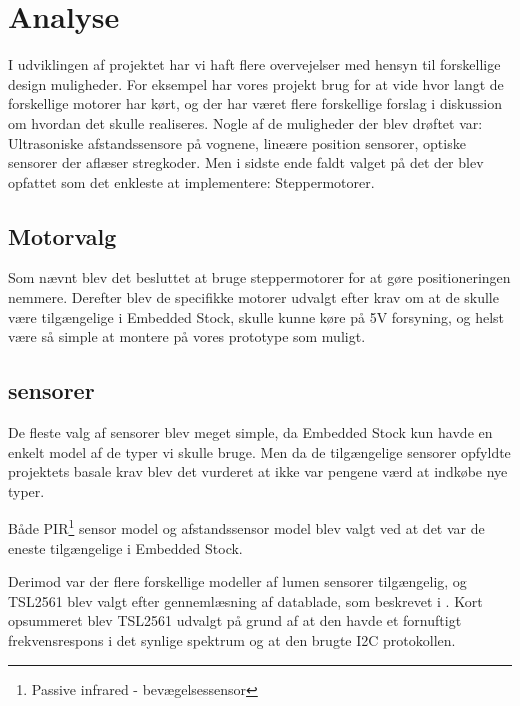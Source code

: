 \section{Analyse}

I udviklingen af projektet har vi haft flere overvejelser med hensyn til forskellige design muligheder. For eksempel har vores projekt brug for at vide hvor langt de forskellige motorer har kørt, og der har været flere forskellige forslag i diskussion om hvordan det skulle realiseres. Nogle af de muligheder der blev drøftet var: Ultrasoniske afstandssensore på vognene, lineære position sensorer, optiske sensorer der aflæser stregkoder. Men i sidste ende faldt valget på det der blev opfattet som det enkleste at implementere: Steppermotorer.

\subsection{Motorvalg}

Som nævnt blev det besluttet at bruge steppermotorer for at gøre positioneringen nemmere. Derefter blev de specifikke motorer udvalgt efter krav om at de skulle være tilgængelige i Embedded Stock, skulle kunne køre på 5V forsyning, og helst være så simple at montere på vores prototype som muligt.

\subsection{sensorer}

De fleste valg af sensorer blev meget simple, da Embedded Stock kun havde en enkelt model af de typer vi skulle bruge. Men da de tilgængelige sensorer opfyldte projektets basale krav blev det vurderet at ikke var pengene værd at indkøbe nye typer.

Både PIR\footnote{Passive infrared - bevægelsessensor} sensor model og afstandssensor model blev valgt ved at det var de eneste tilgængelige i Embedded Stock.

Derimod var der flere forskellige modeller af lumen sensorer tilgængelig, og TSL2561 blev valgt efter gennemlæsning af datablade, som beskrevet i \cite{documentation}. Kort opsummeret blev TSL2561 udvalgt på grund af at den havde et fornuftigt frekvensrespons i det synlige spektrum og at den brugte I2C protokollen.